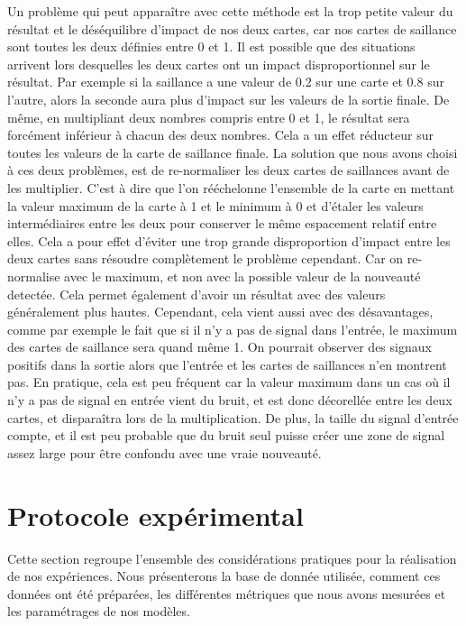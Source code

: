 	Un problème qui peut apparaître avec cette méthode est la trop petite valeur du résultat et le déséquilibre d'impact de nos deux cartes, car nos cartes de saillance sont toutes les deux définies entre 0 et 1. Il est possible que des situations arrivent lors desquelles les deux cartes ont un impact disproportionnel sur le résultat. Par exemple si la saillance a une valeur de 0.2 sur une carte et 0.8 sur l'autre, alors la seconde aura plus d'impact sur les valeurs de la sortie finale. De même, en multipliant deux nombres compris entre 0 et 1, le résultat sera forcément inférieur à chacun des deux nombres. Cela a un effet réducteur sur toutes les valeurs de la carte de saillance finale. La solution que nous avons choisi à ces deux problèmes, est de re-normaliser les deux cartes de saillances avant de les multiplier. C'est à dire que l'on rééchelonne l'ensemble de la carte en mettant la valeur maximum de la carte à 1 et le minimum à 0 et d'étaler les valeurs intermédiaires entre les deux pour conserver le même espacement relatif entre elles. Cela a pour effet d'éviter une trop grande disproportion d'impact entre les deux cartes sans résoudre complètement le problème cependant. Car on re-normalise avec le maximum, et non avec la possible valeur de la nouveauté detectée. Cela permet également d'avoir un résultat avec des valeurs généralement plus hautes. Cependant, cela vient aussi avec des désavantages, comme par exemple le fait que si il n'y a pas de signal dans l'entrée, le maximum des cartes de saillance sera quand même 1. On pourrait observer des signaux positifs dans la sortie alors que l'entrée et les cartes de saillances n'en montrent pas. En pratique, cela est peu fréquent car la valeur maximum dans un cas où il n'y a pas de signal en entrée vient du bruit, et est donc décorellée entre les deux cartes, et disparaîtra lors de la multiplication. De plus, la taille du signal d'entrée compte, et il est peu probable que du bruit seul puisse créer une zone de signal assez large pour être confondu avec une vraie nouveauté.

	\newpage
	\section{Protocole expérimental}

	Cette section regroupe l'ensemble des considérations pratiques pour la réalisation de nos expériences. Nous présenterons la base de donnée utilisée, comment ces données ont été préparées, les différentes métriques que nous avons mesurées et les paramétrages de nos modèles.

